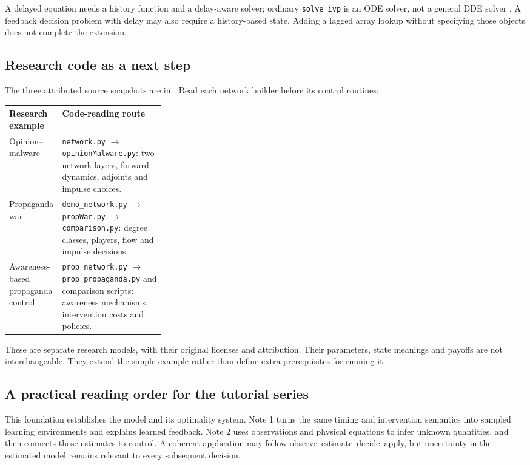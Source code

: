 \documentclass[11pt,a4paper]{article}
\theoremstyle{definition}
\theoremstyle{remark}
\begin{document}
A delayed equation needs a history function and a delay-aware solver; ordinary \texttt{solve\_ivp} is an ODE solver, not a general DDE solver \cite{scipy}. A feedback decision problem with delay may also require a history-based state. Adding a lagged array lookup without specifying those objects does not complete the extension.

\subsection{Research code as a next step}
The three attributed source snapshots are in  \cite{malware2025,war2024,awareness2025}. Read each network builder before its control routines:
\par\noindent\begin{tabularx}{\linewidth}{@{}p{0.30\linewidth}Y@{}}
\toprule
Research example & Code-reading route \\
\midrule
Opinion--malware & \texttt{network.py} $\to$ \texttt{opinionMalware.py}: two network layers, forward dynamics, adjoints and impulse choices. \\
Propaganda war & \texttt{demo\_network.py} $\to$ \texttt{propWar.py} $\to$ \texttt{comparison.py}: degree classes, players, flow and impulse decisions. \\
Awareness-based propaganda control & \texttt{prop\_network.py} $\to$ \texttt{prop\_propaganda.py} and comparison scripts: awareness mechanisms, intervention costs and policies. \\
\bottomrule
\end{tabularx}\par
These are separate research models, with their original licenses and attribution. Their parameters, state meanings and payoffs are not interchangeable. They extend the simple example rather than define extra prerequisites for running it.

\subsection{A practical reading order for the tutorial series}
This foundation establishes the model and its optimality system. Note 1 turns the same timing and intervention semantics into sampled learning environments and explains learned feedback. Note 2 uses observations and physical equations to infer unknown quantities, and then connects those estimates to control. A coherent application may follow observe--estimate--decide--apply, but uncertainty in the estimated model remains relevant to every subsequent decision.
\end{document}
